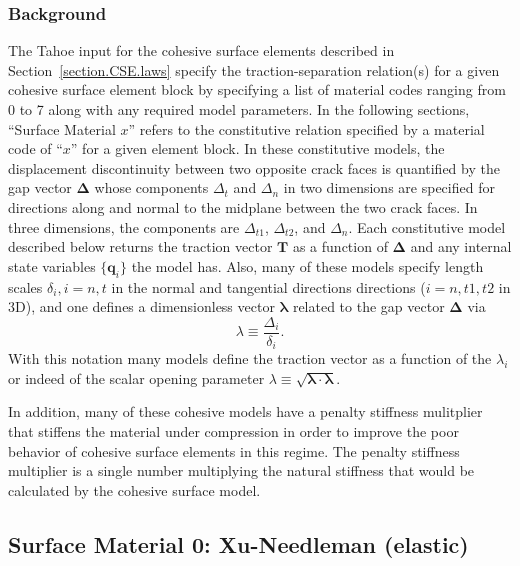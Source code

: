 \subsubsection{Background}
\label{sect.material.surface.common}

The Tahoe input for the cohesive surface elements described in  
Section~\ref{section.CSE.laws} specify the traction-separation relation(s)
for a given cohesive surface element block by specifying a list of material
codes ranging from 0 to 7 along with any required model parameters. In
the following sections,  ``Surface Material $x$'' refers to the constitutive 
relation
specified by a material code of ``$x$'' for a given element block. 
In these constitutive models, the displacement discontinuity between two
opposite crack faces is quantified by the gap vector $\boldsymbol{\Delta}$
whose components $\Delta_t$ and $\Delta_n$ in two dimensions are specified
for directions along and normal to the midplane between the two crack
faces. In three dimensions, the components are $\Delta_{t1}$, $\Delta_{t2}$,
and $\Delta_n$. Each constitutive model described below returns the
traction vector $\mathbf{T}$ as a function of $\boldsymbol{\Delta}$ and any
internal state variables $\{\mathbf{q}_i\}$ the model has.  
Also, many of these models specify 
length scales $\delta_i, i = n,t$ in the normal and tangential directions
directions ($i = n,t1,t2$ in 3D), and one defines a dimensionless vector
$\boldsymbol{\lambda}$ related to the gap vector $\mathbf{\Delta}$ via
\begin{equation}
\lambda \equiv  \frac{\Delta_i}{\delta_i}.
\end{equation}
With this notation many models define the traction
vector as a function of the $\lambda_i$ or indeed of the
scalar opening parameter $\lambda \equiv \sqrt{\boldsymbol{\lambda}
\cdot\boldsymbol{\lambda}}$.

In addition, many of these cohesive models have a penalty stiffness mulitplier
that stiffens the material under compression in order to improve the poor
behavior of cohesive surface elements in this regime. The penalty stiffness
multiplier is a single number multiplying the natural stiffness that would
be calculated by the cohesive surface model. 

\subsection{Surface Material 0: Xu-Needleman (elastic)}
\label{sect.material.surface.xu}

